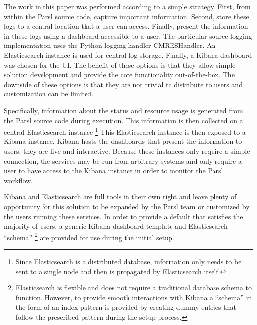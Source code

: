 The work in this paper was performed according to a simple strategy.
First, from within the Parsl source code, capture important information.
Second, store these logs to a central location that a user can access.
Finally, present the information in these logs using a dashboard accessible to a user.
The particular source logging implementation uses the Python logging handler CMRESHandler.
An Elasticsearch instance is used for central log storage.
Finally, a Kibana dashboard was chosen for the UI.
The benefit of these options is that they allow simple solution development and provide the core functionality out-of-the-box.
The downside of these options is that they are not trivial to distribute to users and customization can be limited.

Specifically, information about the status and resource usage is generated from the Parsl source code during execution.
This information is then collected on a central Elasticsearch instance \footnote{Since Elasticsearch is a distributed database, information only needs to be sent to a single node and then is propagated by Elasticsearch itself.}
This Elasticsearch instance is then exposed to a Kibana instance.
Kibana hosts the dashboards that present the information to users; they are live and interactive.
Because these instances only require a simple connection, the services may be run from arbitrary systems and only require a user to have access to the Kibana instance in order to monitor the Parsl workflow.

Kibana and Elasticsearch are full tools in their own right and leave plenty of opportunity for this solution to be expanded by the Parsl team or customized by the users running these services.
In order to provide a default that satisfies the majority of users, a generic Kibana dashboard template and Elasticsearch ``schema'' \footnote{Elasticsearch is flexible and does not require a traditional database schema to function. However, to provide smooth interactions with Kibana a ``schema'' in the form of an index pattern is provided by creating dummy entries that follow the prescribed pattern during the setup process.} are provided for use during the initial setup.

